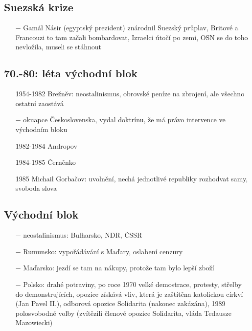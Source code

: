 \documentclass{article}
\begin{document}
\subsection*{Suezská krize}
\begin{itemize}
    \vspace{-0.5em}
    \setlength\itemsep{0.15em}
    \item[$-$] Gamál Násir (egyptský prezident) znárodnil Suezský průplav, Britové a Francouzi to tam začali bombardovat, Izraelci útočí po zemi, OSN se do toho nevložila, museli se stáhnout
\end{itemize}

\subsection*{70.-80: léta východní blok}
\begin{itemize}
    \vspace{-0.5em}
    \setlength\itemsep{0.15em}
    \item[1954-1982] Brežněv: neostalinismus, obrovské peníze na zbrojení, ale všechno ostatní zaostává
    \item[$-$] okuapce Československa, vydal doktrínu, že má právo intervence ve východním bloku
    \item[1982-1984]  Andropov
    \item[1984-1985] Černěnko
    \item[1985] Michail Gorbačov: uvolnění, nechá jednotlivé republiky rozhodvat samy, svoboda slova
\end{itemize}

\subsection*{Východní blok}
\begin{itemize}
    \vspace{-0.5em}
    \setlength\itemsep{0.15em}
    \item[$-$] neostalinismus: Bulharsko, NDR, ČSSR
    \item[$-$] Rumunsko: vypořádávání s Maďary, oslabení cenzury
    \item[$-$] Maďarsko: jezdí se tam na nákupy, protože tam bylo lepší zboží
    \item[$-$] Polsko: drahé potraviny, po roce 1970 velké demostrace, protesty, střelby do demonstrujících, opozice získává vliv, která je zaštítěna katolickou církví (Jan Pavel II.), odborová opozice Solidarita (nakonec zakázána), 1989 polosvobodné volby (zvítězili členové opozice Solidarita, vláda Tedausze Mazowiecki)

\end{itemize}
\end{document}
